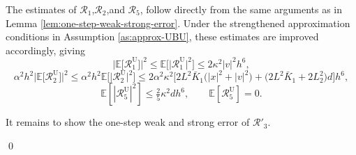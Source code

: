 \documentclass[12pt]{article}
\newenvironment{redtext}
  {\color{black}\ignorespaces}
  {\ignorespacesafterend}
\numberwithin{equation}{section}
\renewenvironment{proof}%
  {\begin{trivlist}%
   \item[]\ignorespaces}%
  {\qed\end{trivlist}}
\newcommand{\E}{\mathbb{E}}
\begin{document}
\begin{redtext}
\begin{proof}
The estimates of $\mathcal{R}_1$,$\mathcal{R}_2$,and $\mathcal{R}_5$, follow directly from the same arguments as in Lemma \ref{lem:one-step-weak-strong-error}. Under the strengthened approximation conditions in Assumption \ref{as:approx-UBU}, these estimates are improved accordingly, giving
\begin{equation}
\big|
\mathbb E
\big[ \mathcal R^{\mathrm{U}}_1 \big]
\big|^2
\leq
\mathbb E
\Big[\big
|\mathcal R^{\mathrm{U}}_1
\big|^2\Big]
\leq
2\kappa^2|v|^2h^6,
\end{equation}
\begin{equation}
\alpha^2h^2
\big|
\mathbb E
\big[\mathcal R^{\mathrm{U}}_2\big]
\big|^2
\leq
\alpha^2h^2
\mathbb E
\Big[\big|
\mathcal R^{\mathrm{U}}_2
\big|^2\Big]
\leq
2\alpha^2\kappa^2
\Big[
2L^2\bar K_1
\big(
|x|^2+|v|^2
\big)
+
\big(
2L^2\bar K_1+2L_2^2
\big)d
\Big]h^6, 
\end{equation}
\begin{equation}
\mathbb E[|\mathcal R^{\mathrm{U}}_5|^2]
\leq
\tfrac{2}{5}\kappa^2dh^6, \qquad
\E [\mathcal R^{\mathrm{U}}_5]=0.
\end{equation}

It remains to show the one-step weak and strong error of $\mathcal{R}'_3$.


\end{proof}
\end{redtext}
\end{document}
